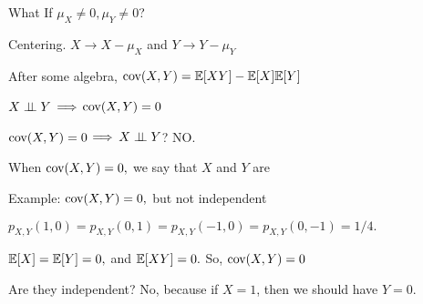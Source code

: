\begin{frame}{What If $\mu_X \neq 0, \mu_Y \neq 0$?}

\plitemsep 0.1in

\bci

\item<2->  Centering. $X \rightarrow X - \mu_X$ and $Y \rightarrow Y-\mu_Y$

\item<4-> After some algebra, $\text{cov}( X,Y ) = \mathbb{E}[ XY ] - \mathbb{E}[ X ]\mathbb{E}[ Y ]$

\item<5-> $X \perp \!\!\! \perp Y$ $\Longrightarrow$ $\text{cov}( X,Y )=0$

\item<6-> $\text{cov}( X,Y )=0$ $\Longrightarrow$ $X \perp \!\!\! \perp Y$? NO.

\item<7-> When $\text{cov}( X,Y )=0,$ we say that $X$ and $Y$ are 

\eci

\end{frame}

\begin{frame}{Example: $\text{cov}( X,Y )=0,$ but not independent}

\plitemsep 0.1in

\bci

\item $p_{X,Y}(1,0) = p_{X,Y}(0,1) = p_{X,Y}(-1,0) = p_{X,Y}(0,-1) = 1/4.$

\item<2-> $\mathbb{E}[ X ] = \mathbb{E}[ Y ]=0,$ and $\mathbb{E}[ XY ]=0.$ So, $\text{cov}( X,Y )=0$

\item<3-> Are they independent? No, because if $X=1$, then we should have $Y=0.$

\eci
\centering
{}
\end{frame}

